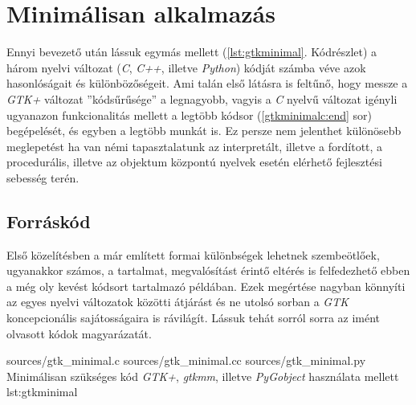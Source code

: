 \section{Minimálisan alkalmazás}
\label{sec:gtkminimal}
\label{sec:gtkmmminimal}

Ennyi bevezető után lássuk egymás mellett (\ref{lst:gtkminimal}. Kódrészlet) a három nyelvi változat (\textit{C}, \textit{C++}, illetve \textit{Python}) kódját számba véve azok hasonlóságait és különbözőségeit. Ami talán első látásra is feltűnő, hogy messze a \textit{GTK+} változat ''kódsűrűsége'' a legnagyobb, vagyis a \textit{C} nyelvű változat igényli ugyanazon funkcionalitás mellett a legtöbb kódsor (\ref{gtkminimalc:end} sor) begépelését, és egyben a legtöbb munkát is. Ez persze nem jelenthet különösebb meglepetést ha van némi tapasztalatunk az interpretált, illetve a fordított, a procedurális, illetve az objektum központú nyelvek esetén elérhető fejlesztési sebesség terén.

\subsection{Forráskód}

Első közelítésben a már említett formai különbségek lehetnek szembeötlőek, ugyanakkor számos, a tartalmat, megvalósítást érintő eltérés is felfedezhető ebben a még oly kevést kódsort tartalmazó példában. Ezek megértése nagyban könnyíti az egyes nyelvi változatok közötti átjárást és ne utolsó sorban a \textit{GTK} koncepcionális sajátosságaira is rávilágít. Lássuk tehát sorról sorra az imént olvasott kódok magyarázatát.

\lsttriplesource
{sources/gtk_minimal.c}
{sources/gtk_minimal.cc}
{sources/gtk_minimal.py}
{Minimálisan szükséges kód \textit{GTK+}, \textit{gtkmm}, illetve \textit{PyGobject} használata mellett}
{lst:gtkminimal}

